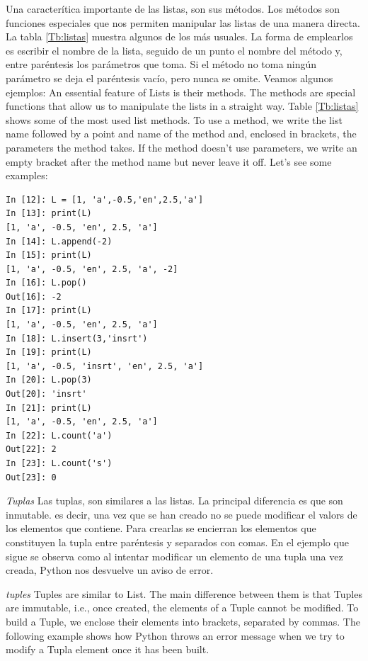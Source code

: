\begin{paracol}{2}
Una caracterítica importante de las listas, son sus métodos. Los métodos son funciones especiales que nos permiten manipular las listas de una manera directa. La tabla \ref{Tb:listas} muestra algunos de los más usuales. La forma de emplearlos es escribir el nombre de la lista, seguido de un punto el nombre del método y, entre paréntesis los parámetros que toma. Si el método no toma ningún parámetro se deja el paréntesis vacío, pero nunca se omite. Veamos algunos ejemplos:
\switchcolumn
An essential feature of Lists is their methods. The methods are special functions that allow us to manipulate the lists in a straight way. Table \ref{Tb:listas} shows some of the most used list methods. To use a method, we write the list name followed by a point and name of the method and, enclosed in brackets, the parameters the method takes. If the method doesn't use parameters, we write an empty bracket after the method name but never leave it off. Let's see some examples:
\end{paracol}

\begin{center}
    \begin{minipage}{0.5\textwidth}
\begin{verbatim}
In [12]: L = [1, 'a',-0.5,'en',2.5,'a']
In [13]: print(L)
[1, 'a', -0.5, 'en', 2.5, 'a']
In [14]: L.append(-2)
In [15]: print(L)
[1, 'a', -0.5, 'en', 2.5, 'a', -2]
In [16]: L.pop()
Out[16]: -2
In [17]: print(L)
[1, 'a', -0.5, 'en', 2.5, 'a']
In [18]: L.insert(3,'insrt')
In [19]: print(L)
[1, 'a', -0.5, 'insrt', 'en', 2.5, 'a']
In [20]: L.pop(3)
Out[20]: 'insrt'
In [21]: print(L)
[1, 'a', -0.5, 'en', 2.5, 'a']
In [22]: L.count('a')
Out[22]: 2
In [23]: L.count('s')
Out[23]: 0
\end{verbatim}
    \end{minipage}
\end{center}

\begin{paracol}{2}

\emph{Tuplas} Las tuplas, son similares a las listas. La principal diferencia es que son inmutable. es decir, una vez que se han creado no se puede modificar el valors de los elementos que contiene. Para crearlas se encierran los elementos que constituyen la tupla entre paréntesis y separados con comas. En el ejemplo que sigue se observa como al intentar modificar un elemento de una tupla una vez creada, Python nos desvuelve un aviso de error.
\switchcolumn

\emph{tuples} Tuples are similar to List. The main difference between them is that Tuples are immutable, i.e., once created, the elements of a Tuple cannot be modified. To build a Tuple, we enclose their elements into brackets, separated by commas. The following example shows how Python throws an error message when we try to modify a Tupla element once it has been built.
\end{paracol}


